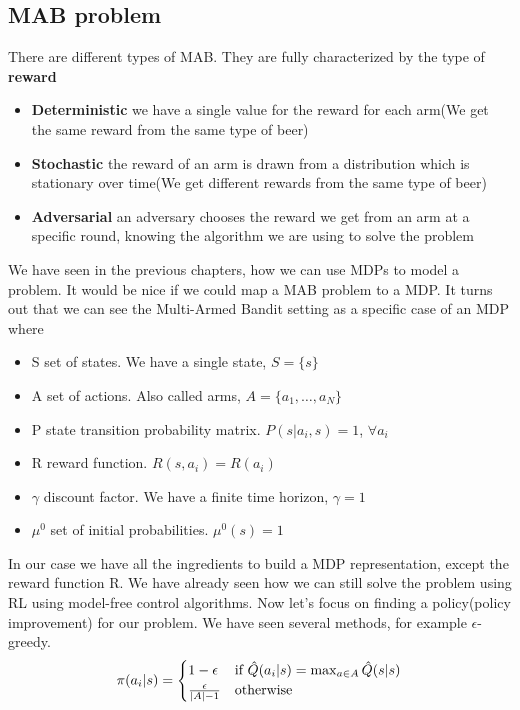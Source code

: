 \documentclass[main.tex]{subfiles}
\begin{document}
\subsection{MAB problem}
There are different types of MAB. They are fully characterized by the type of \textbf{reward}
\begin{itemize}
    \item \textbf{Deterministic} we have a single value for the reward for each arm(We get the same reward from the same type of beer)
    \item \textbf{Stochastic} the reward of an arm is drawn from a distribution which is
stationary over time(We get different rewards from the same type of beer)
    \item \textbf{Adversarial} an adversary chooses the reward we get from an arm at a
specific round, knowing the algorithm we are using to solve the problem
\end{itemize}
We have seen in the previous chapters, how we can use MDPs to model a problem. It would be nice if we could map a MAB problem to a MDP. It turns out that we can see the Multi-Armed Bandit setting as a specific case of an MDP where
\begin{itemize}
    \item S set of states. We have a single state, $S=\{s\}$
    \item A set of actions. Also called arms, $A=\{a_1,\dots,a_N\}$
    \item P state transition probability matrix. $P(s|a_i,s)=1$, $\forall a_i$
    \item R reward function. $R(s,a_i)=R(a_i)$
    \item $\gamma$ discount factor. We have a finite time horizon, $\gamma=1$
    \item $\mu^0$ set of initial probabilities. $\mu^0(s)=1$
\end{itemize}
In our case we have all the ingredients to build a MDP representation, except the reward function R. We have already seen how we can still solve the problem using RL using model-free control algorithms. Now let's focus on finding a policy(policy improvement) for our problem. We have seen several methods, for example $\epsilon$-greedy.
\begin{equation}
    \pi(a_i|s)=
    \begin{cases}
    1-\epsilon &\text{if }\Hat{Q}(a_i|s) = \max_{a \in A}\Hat{Q}(s|s) \\
    \frac{\epsilon}{|A|-1} &\text{otherwise}
    \end{cases}
\end{equation}
\end{document}
